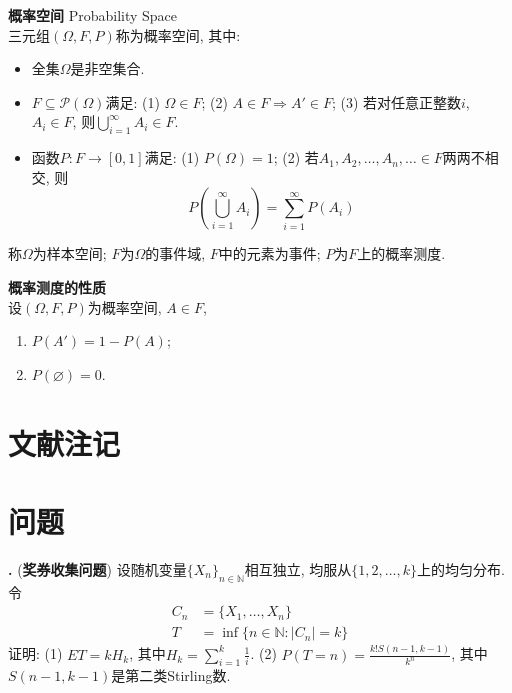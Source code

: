 

\begin{dfn}\textbf{概率空间} Probability Space\\
三元组$(\Omega, F, P)$称为概率空间, 其中:
\begin{itemize}
\item 全集$\Omega$是非空集合.
\item $F\subseteq \mathcal{P} (\Omega)$满足: (1) $\Omega \in F$; (2) $A\in F \Rightarrow A' \in F$; (3) 若对任意正整数$i$, $A_i \in F$, 则$ \bigcup_{i=1}^\infty A_i \in F$. 
\item 函数$P: F\to [0,1]$满足: (1) $P(\Omega)=1$; (2) 若$A_1,A_2,\dots,A_n,\dots \in F$两两不相交, 则
\begin{equation}
    P\left(\bigcup_{i=1}^\infty A_i \right)=\sum_{i=1}^\infty P(A_i)
\end{equation}
\end{itemize}
称$\Omega$为样本空间; $F$为$\Omega$的事件域, $F$中的元素为事件; $P$为$F$上的概率测度. 
\end{dfn}

\begin{pro}\textbf{概率测度的性质}\\
设$(\Omega, F, P)$为概率空间, $A\in F$,
\begin{enumerate}
\item $P(A')=1-P(A)$;
\item $P(\varnothing)=0$.
\end{enumerate}
\end{pro}

\section*{文献注记}

\section*{问题}
\par \textbf{\theprobprob .} (\textbf{奖券收集问题}) 设随机变量$\{X_n\}_{n\in \mathbb{N}}$相互独立, 均服从$\{1,2,\dots,k\}$上的均匀分布. 令
\begin{align}
    C_n &= \{X_1,\dots,X_n\} \\
    T &= \inf \{n\in \mathbb{N}: |C_n| = k\}
\end{align}
证明: (1) $E T = kH_k$, 其中$H_k=\sum_{i=1}^k \frac{1}{i}$. (2) $P(T=n)=\frac{k!S(n-1,k-1)}{k^n}$, 其中$S(n-1,k-1)$是第二类Stirling数. 

